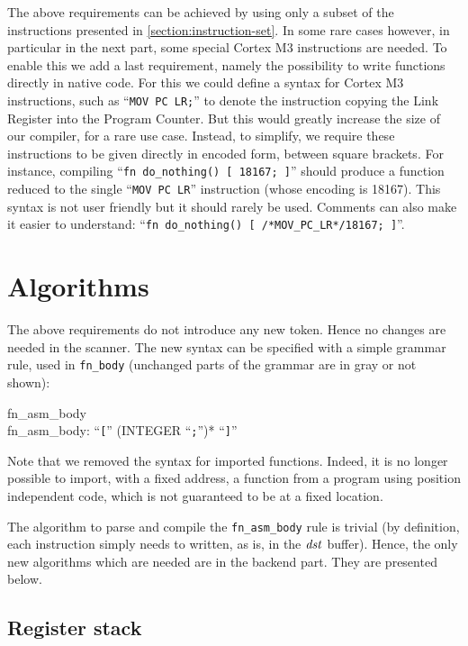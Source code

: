 The above requirements can be achieved by using only a subset of the
instructions presented in \cref{section:instruction-set}. In some rare cases
however, in particular in the next part, some special Cortex M3 instructions
are needed. To enable this we add a last requirement, namely the possibility to
write functions directly in native code. For this we could define a syntax for
Cortex M3 instructions, such as ``{\tt MOV PC LR;}'' to denote the instruction
copying the Link Register into the Program Counter. But this would greatly
increase the size of our compiler, for a rare use case. Instead, to simplify,
we require these instructions to be given directly in encoded form, between
square brackets. For instance, compiling ``{\tt fn do\_nothing() [ 18167; ]}''
should produce a function reduced to the single ``{\tt MOV PC LR}'' instruction
(whose encoding is 18167). This syntax is not user friendly but it should
rarely be used. Comments can also make it easier to understand: ``{\tt fn
do\_nothing() [ /*MOV\_PC\_LR*/18167; ]}''.

\section{Algorithms}

The above requirements do not introduce any new token. Hence no changes are
needed in the scanner. The new syntax can be specified with a simple grammar
rule, used in {\tt fn\_body} (unchanged parts of the grammar are in gray or not
shown):

\begin{Paragraph}
fn\_asm\_body \\
fn\_asm\_body: ``{\tt [}'' (INTEGER ``{\tt ;}'')* ``{\tt ]}''
\end{Paragraph}

Note that we removed the syntax for imported functions. Indeed, it is no longer
possible to import, with a fixed address, a function from a program using
position independent code, which is not guaranteed to be at a fixed location.

The algorithm to parse and compile the {\tt fn\_asm\_body} rule is trivial (by
definition, each instruction simply needs to written, as is, in the $\it{dst}$
buffer). Hence, the only new algorithms which are needed are in the backend
part. They are presented below.

\subsection{Register stack}\label{subsection:register-stack}

